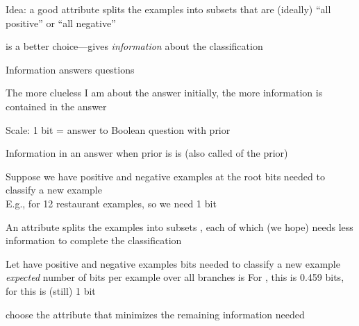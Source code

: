 \documentclass{article}
\begin{document}
\begin{huge}

Idea: a good attribute splits the examples into subsets that are
(ideally) ``all positive'' or ``all negative''

\vspace*{0.5in}

\textwidth
{}

 is a better choice---gives \emph{information} about the classification




Information answers questions

The more clueless I am about the answer initially, the more
information is contained in the answer

Scale: 1 bit = answer to Boolean question with prior 

Information in an answer when prior is  is
\mat{\[
  H(\<P_1,\ldots,P_n\>) = \mysum_{i\eq 1}^n - P_i \log_2 P_i
\]}
(also called  of the prior)




Suppose we have  positive and  negative examples at the root\nl
\mat{$\implies$}  bits needed to classify a new example\\
E.g., for 12 restaurant examples,  so we need 1 bit

An attribute splits the examples  into subsets , each of which
(we hope) needs less information to complete the classification

Let  have  positive and  negative examples\al
\mat{$\implies$}  bits needed to classify a new example\al
\mat{$\implies$} \emph{expected} number of bits per example over all branches is
For , this is 0.459 bits, for  this is (still) 1 bit

\mat{$\implies$} choose the attribute that minimizes the remaining information needed



\end{huge}
\end{document}
